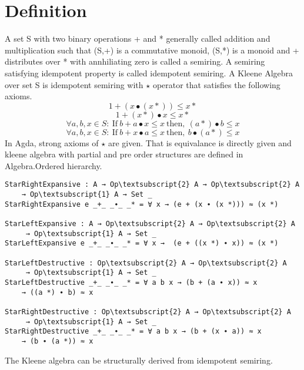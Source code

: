 \section{Definition}
A set S with two binary operations + and * generally called addition and multiplication such that (S,+) is a commutative monoid, (S,*) is a monoid and + distributes over * with annhiliating zero is called a semiring. A semiring satisfying idempotent property is called idempotent semiring. A Kleene Algebra over set S is idempotent semiring with \( \star \) operator that satisfies the following axioms.
\begin{equation}\label{eq_starrightexpansive}
1 + (x ∙ (x *)) \leq x *
\end{equation}
\begin{equation}\label{eq_starleftexpansive}
1 + (x *) ∙ x \leq x *
\end{equation}
\begin{equation}\label{eq_starleftdestructive}
\forall a, b, x \in S: \  \text{If} \ b + a  ∙ x \leq x \ \text{then},\  (a *)  ∙ b \leq x
\end{equation}
\begin{equation}\label{eq_starrightdestructive}
\forall a, b, x \in S: \  \text{If} \ b + x  ∙ a \leq x \  \text{then},\  b  ∙ (a *) \leq x
\end{equation}
In Agda, strong axioms of \(\star\) are given. That is equivalance is directly given and kleene algebra with partial and pre order structures are defined in Algebra.Ordered hierarchy. 
\begin{Verbatim}[commandchars=\\\{\},samepage=true]
StarRightExpansive : A → Op\textsubscript{2} A → Op\textsubscript{2} A 
	→ Op\textsubscript{1} A → Set _
StarRightExpansive e _+_ _∙_ _* = ∀ x → (e + (x ∙ (x *))) ≈ (x *)

StarLeftExpansive : A → Op\textsubscript{2} A → Op\textsubscript{2} A
	 → Op\textsubscript{1} A → Set _
StarLeftExpansive e _+_ _∙_ _* = ∀ x →  (e + ((x *) ∙ x)) ≈ (x *)

StarLeftDestructive : Op\textsubscript{2} A → Op\textsubscript{2} A
	 → Op\textsubscript{1} A → Set _
StarLeftDestructive _+_ _∙_ _* = ∀ a b x → (b + (a ∙ x)) ≈ x 
	→ ((a *) ∙ b) ≈ x

StarRightDestructive : Op\textsubscript{2} A → Op\textsubscript{2} A
	 → Op\textsubscript{1} A → Set _
StarRightDestructive _+_ _∙_ _* = ∀ a b x → (b + (x ∙ a)) ≈ x 
	→ (b ∙ (a *)) ≈ x
\end{Verbatim}
The Kleene algebra can be structurally derived from idempotent semiring. 
